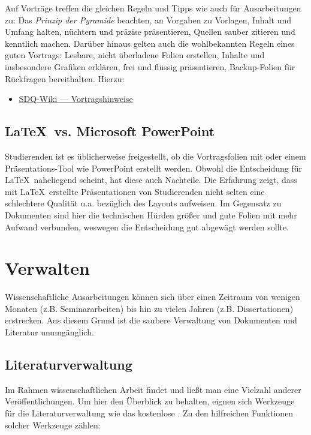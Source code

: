 Auf Vorträge treffen die gleichen Regeln und Tipps wie auch für Ausarbeitungen zu: Das \emph{Prinzip der Pyramide} beachten, an Vorgaben zu Vorlagen, Inhalt und Umfang halten, nüchtern und präzise präsentieren, Quellen sauber zitieren und kenntlich machen.
Darüber hinaus gelten auch die wohlbekannten Regeln eines guten Vortrags: Lesbare, nicht überladene Folien erstellen, Inhalte und insbesondere Grafiken erklären, frei und flüssig präsentieren, Backup-Folien für Rückfragen bereithalten. Hierzu:

\smallskip
\begin{itemize}[label={\symbolInfo}]
    \item \href{https://sdqweb.ipd.kit.edu/wiki/Vortragshinweise}{SDQ-Wiki --- Vortragshinweise}
\end{itemize}

\subsection{\LaTeX\ vs. Microsoft PowerPoint}%
\label{sec:Praesentieren:PowerPoint}

Studierenden ist es üblicherweise freigestellt, ob die Vortragsfolien mit  oder einem Präsentations-Tool wie PowerPoint erstellt werden.
Obwohl die Entscheidung für \LaTeX\ naheliegend scheint, hat diese auch Nachteile.
Die Erfahrung zeigt, dass mit \LaTeX\ erstellte Präsentationen von Studierenden nicht selten eine schlechtere Qualität u.a. bezüglich des Layouts aufweisen.
Im Gegensatz zu Dokumenten sind hier die technischen Hürden größer und gute Folien mit mehr Aufwand verbunden, weswegen die Entscheidung gut abgewägt werden sollte.


\section{Verwalten}%
\label{sec:Verwalten}

Wissenschaftliche Ausarbeitungen können sich über einen Zeitraum von wenigen Monaten (z.B. Seminararbeiten) bis hin zu vielen Jahren (z.B. Dissertationen) erstrecken.
Aus diesem Grund ist die saubere Verwaltung von Dokumenten und Literatur unumgänglich.

\subsection{Literaturverwaltung}%
\label{sec:Verwalten:Literatur}

Im Rahmen wissenschaftlichen Arbeit findet und ließt man eine Vielzahl anderer Veröffentlichungen.
Um hier den Überblick zu behalten, eignen sich Werkzeuge für die Literaturverwaltung wie das kostenlose .
Zu den hilfreichen Funktionen solcher Werkzeuge zählen:

